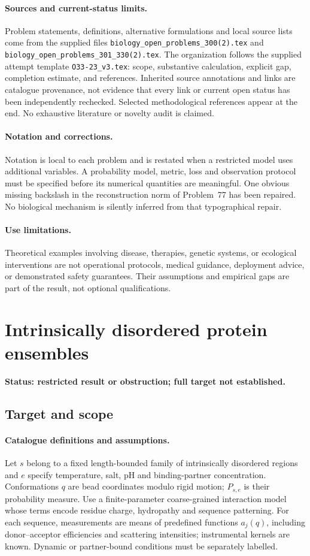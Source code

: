 \documentclass[11pt]{article}
\begin{document}
\paragraph{Sources and current-status limits.}
Problem statements, definitions, alternative formulations and local source lists
come from the supplied files
\texttt{biology\_open\_problems\_300(2).tex} and
\texttt{biology\_open\_problems\_301\_330(2).tex}.
The organization follows the supplied attempt template
\texttt{O33-23\_v3.tex}: scope, substantive calculation, explicit gap,
completion estimate, and references. Inherited source annotations and links are
catalogue provenance, not evidence that every link or current open status has
been independently rechecked. Selected methodological references appear at the
end. No exhaustive literature or novelty audit is claimed.

\paragraph{Notation and corrections.}
Notation is local to each problem and is restated when a restricted model uses
additional variables. A probability model, metric, loss and observation protocol
must be specified before its numerical quantities are meaningful. One obvious
missing backslash in the reconstruction norm of Problem~77 has been repaired.
No biological mechanism is silently inferred from that typographical repair.

\paragraph{Use limitations.}
Theoretical examples involving disease, therapies, genetic systems, or ecological
interventions are not operational protocols, medical guidance, deployment advice,
or demonstrated safety guarantees. Their assumptions and empirical gaps are part
of the result, not optional qualifications.


\section*{Intrinsically disordered protein ensembles}
\label{prob:003}
\noindent\textbf{Status: restricted result or obstruction; full target not established.}
\subsection{Target and scope}
\paragraph{Catalogue definitions and assumptions.}
Let $s$ belong to a fixed length-bounded family of intrinsically disordered regions and $e$ specify temperature, salt, pH and binding-partner concentration. Conformations $q$ are bead coordinates modulo rigid motion; $P_{s,e}$ is their probability measure. Use a finite-parameter coarse-grained interaction model whose terms encode residue charge, hydropathy and sequence patterning. For each sequence, measurements are means of predefined functions $a_j(q)$, including donor--acceptor efficiencies and scattering intensities; instrumental kernels are known. Dynamic or partner-bound conditions must be separately labelled.
\end{document}
